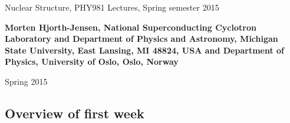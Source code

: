 \documentclass[%
twoside,                 %
final,                   %
10pt]{article}
\begin{document}






\thispagestyle{empty}

\begin{center}
{\LARGE\bf
\begin{spacing}{1.25}
Nuclear Structure, PHY981  Lectures, Spring semester 2015
\end{spacing}
}
\end{center}


\begin{center}
{\bf Morten Hjorth-Jensen, National Superconducting Cyclotron Laboratory and Department of Physics and Astronomy, Michigan State University, East Lansing, MI 48824, USA and Department of Physics, University of Oslo, Oslo, Norway${}^{}$} \\ [0mm]
\end{center}

    \begin{center}
\end{center}
    

\begin{center} %
Spring 2015 
\end{center}

\vspace{1cm}


\subsection{Overview of first week}

\paragraph{}
\end{document}
